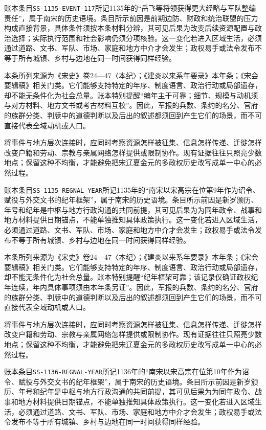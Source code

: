 账本条目\texttt{SS-1135-EVENT-117}所记1135年的“岳飞等将领获得更大经略与军队整编责任”，属于南宋的历史语境。条目所示前因是前期边防、财政和统治联盟的压力构成直接背景，具体条件须按本条材料分辨，其可见后果为改变后续资源配置与政治选择；实际执行范围和社会影响仍须分项核验。这一变化若进入区域生活，必须通过道路、文书、军队、市场、家庭和地方中介才会发生；政权易手或法令发布不等于所有城镇、乡村与边地在同一时间获得同样经验。

本条所列来源为《宋史》卷24—47〈本纪〉；《建炎以来系年要录》本年条；《宋会要辑稿》相关门类。它们能够支持特定的年序、制度语言、政治行动或局部遗存，却不能无条件化为社会总量。账本特别提醒“编年主干可靠；细节、规模与动机须与对方材料、地方文书或考古材料互校”。因此，军报的兵数、条约的名分、官府的族群分类、判牍中的道德判断以及后出的叙述都须回到产生它们的场景，而不可直接代表全域动机或人口。

将事件与地方层次连接时，应同时考察资源怎样被征集、信息怎样传递、迁徙怎样改变户籍和劳动、宗教与亲属网络怎样提供或限制协作。现有证据往往只照亮少数地点；保留这种不均衡，才能避免把宋辽夏金元的多政权历史改写成单一中心的必然过程。

账本条目\texttt{SS-1135-REGNAL-YEAR}所记1135年的“南宋以宋高宗在位第9年作为诏令、赋役与外交文书的纪年框架”，属于南宋的历史语境。条目所示前因是新岁颁历、年号和纪年是中枢与地方行政沟通的共同前提，其可见后果为为同年政令、战事和地方材料提供日期锚点，不能单独推知具体政策执行。这一变化若进入区域生活，必须通过道路、文书、军队、市场、家庭和地方中介才会发生；政权易手或法令发布不等于所有城镇、乡村与边地在同一时间获得同样经验。

本条所列来源为《宋史》卷24—47〈本纪〉；《建炎以来系年要录》本年条；《宋会要辑稿》相关门类。它们能够支持特定的年序、制度语言、政治行动或局部遗存，却不能无条件化为社会总量。账本特别提醒“纪年框架可靠；该记录仅确证政权纪年连续，年内具体事项须由本年条另证”。因此，军报的兵数、条约的名分、官府的族群分类、判牍中的道德判断以及后出的叙述都须回到产生它们的场景，而不可直接代表全域动机或人口。

将事件与地方层次连接时，应同时考察资源怎样被征集、信息怎样传递、迁徙怎样改变户籍和劳动、宗教与亲属网络怎样提供或限制协作。现有证据往往只照亮少数地点；保留这种不均衡，才能避免把宋辽夏金元的多政权历史改写成单一中心的必然过程。

账本条目\texttt{SS-1136-REGNAL-YEAR}所记1136年的“南宋以宋高宗在位第10年作为诏令、赋役与外交文书的纪年框架”，属于南宋的历史语境。条目所示前因是新岁颁历、年号和纪年是中枢与地方行政沟通的共同前提，其可见后果为为同年政令、战事和地方材料提供日期锚点，不能单独推知具体政策执行。这一变化若进入区域生活，必须通过道路、文书、军队、市场、家庭和地方中介才会发生；政权易手或法令发布不等于所有城镇、乡村与边地在同一时间获得同样经验。


